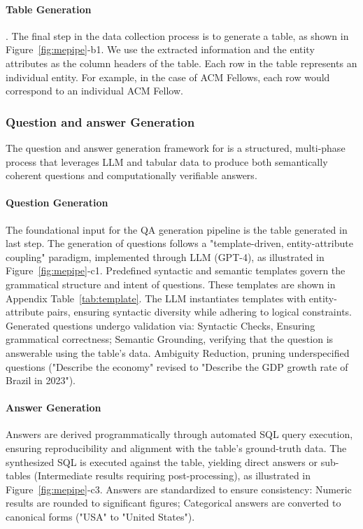 \paragraph{Table Generation}. The final step in the data collection process is to generate a table, as shown in Figure~\ref{fig:mepipe}-b1. We use the extracted information and the entity attributes as the column headers of the table. Each row in the table represents an individual entity. For example, in the case of ACM Fellows, each row would correspond to an individual ACM Fellow. 

\subsubsection{Question and answer Generation}  
The question and answer generation framework for \ben is a structured, multi-phase process that leverages LLM and tabular data to produce both semantically coherent questions and computationally verifiable answers.

\paragraph{Question Generation}
The foundational input for the QA generation pipeline is the table generated in last step. The generation of questions follows a "template-driven, entity-attribute coupling" paradigm, implemented through LLM (GPT-4), as illustrated in Figure~\ref{fig:mepipe}-c1. Predefined syntactic and semantic templates govern the grammatical structure and intent of questions. These templates are shown in Appendix Table~\ref{tab:template}. The LLM instantiates templates with entity-attribute pairs, ensuring syntactic diversity while adhering to logical constraints. Generated questions undergo validation via: Syntactic Checks, Ensuring grammatical correctness; Semantic Grounding, verifying that the question is answerable using the table’s data. Ambiguity Reduction, pruning underspecified questions (\eg "Describe the economy" revised to "Describe the GDP growth rate of Brazil in 2023").
\paragraph{Answer Generation}
Answers are derived programmatically through automated SQL query execution, ensuring reproducibility and alignment with the table’s ground-truth data. The synthesized SQL is executed against the table, yielding direct answers or sub-tables (Intermediate results requiring post-processing), as illustrated in Figure~\ref{fig:mepipe}-c3. Answers are standardized to ensure consistency: Numeric results are rounded to significant figures; Categorical answers are converted to canonical forms (\eg "USA" to "United States").
